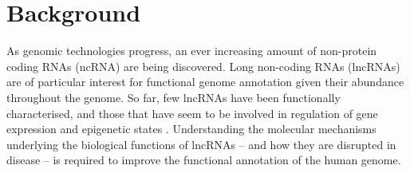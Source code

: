 \documentclass{bmcart}
\begin{document}
\begin{frontmatter}
\begin{abstractbox}
\begin{keyword}
\end{keyword}


\end{abstractbox}
%

\end{frontmatter}





\section*{Background}

As genomic technologies progress, an ever increasing amount of non-protein coding RNAs (ncRNA) are being discovered. Long non-coding RNAs (lncRNAs) are of particular interest for functional genome
annotation given their abundance throughout the genome. So far, few lncRNAs have been functionally characterised, and those that have seem to be involved in regulation of gene expression and epigenetic states 
\cite{morris2014rise,engreitz2016long}. Understanding the
molecular mechanisms underlying the biological functions of lncRNAs -- and how
they are disrupted in disease -- is required to improve the functional
annotation of the human genome. \\
\end{document}
